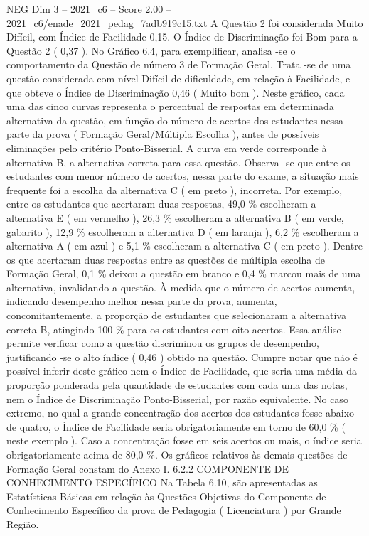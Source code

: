 \begin{textsample}{NEG Dim 3 – 2021\_c6 – Score 2.00 – 2021\_c6/enade\_2021\_pedag\_7adb919c15.txt}
A Questão 2 foi considerada Muito Difícil, com Índice de Facilidade 0,15.
O Índice de Discriminação foi Bom para a Questão 2 ( 0,37 ).
No Gráfico 6.4, para exemplificar, analisa -se o comportamento da Questão de número 3 de Formação Geral.
Trata -se de uma questão considerada com nível Difícil de dificuldade, em relação à Facilidade, e que obteve o Índice de Discriminação 0,46 ( Muito bom ).
Neste gráfico, cada uma das cinco curvas representa o percentual de respostas em determinada alternativa da questão, em função do número de acertos dos estudantes nessa parte da prova ( Formação Geral/Múltipla Escolha ), antes de possíveis eliminações pelo critério Ponto-Bisserial.
A curva em verde corresponde à alternativa B, a alternativa correta para essa questão.
Observa -se que entre os estudantes com menor número de acertos, nessa parte do exame, a situação mais frequente foi a escolha da alternativa C ( em preto ), incorreta.
Por exemplo, entre os estudantes que acertaram duas respostas, 49,0 \% escolheram a alternativa E ( em vermelho ), 26,3 \% escolheram a alternativa B ( em verde, gabarito ), 12,9 \% escolheram a alternativa D ( em laranja ), 6,2 \% escolheram a alternativa A ( em azul ) e 5,1 \% escolheram a alternativa C ( em preto ).
Dentre os que acertaram duas respostas entre as questões de múltipla escolha de Formação Geral, 0,1 \% deixou a questão em branco e 0,4 \% marcou mais de uma alternativa, invalidando a questão.
À medida que o número de acertos aumenta, indicando desempenho melhor nessa parte da prova, aumenta, concomitantemente, a proporção de estudantes que selecionaram a alternativa correta B, atingindo 100 \% para os estudantes com oito acertos.
Essa análise permite verificar como a questão discriminou os grupos de desempenho, justificando -se o alto índice ( 0,46 ) obtido na questão.
Cumpre notar que não é possível inferir deste gráfico nem o Índice de Facilidade, que seria uma média da proporção ponderada pela quantidade de estudantes com cada uma das notas, nem o Índice de Discriminação Ponto-Bisserial, por razão equivalente.
No caso extremo, no qual a grande concentração dos acertos dos estudantes fosse abaixo de quatro, o Índice de Facilidade seria obrigatoriamente em torno de 60,0 \% ( neste exemplo ).
Caso a concentração fosse em seis acertos ou mais, o índice seria obrigatoriamente acima de 80,0 \%.
Os gráficos relativos às demais questões de Formação Geral constam do Anexo I. 6.2.2 COMPONENTE DE CONHECIMENTO ESPECÍFICO Na Tabela 6.10, são apresentadas as Estatísticas Básicas em relação às Questões Objetivas do Componente de Conhecimento Específico da prova de Pedagogia ( Licenciatura ) por Grande Região.

\end{textsample}
